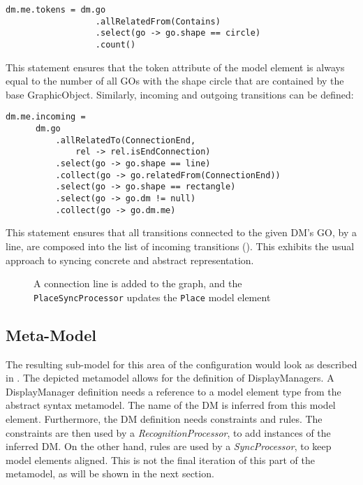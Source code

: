 \begin{lstlisting}[captionpos=b,caption={Rule that syncs the token count of a place element}]
dm.me.tokens = dm.go
                  .allRelatedFrom(Contains)
                  .select(go -> go.shape == circle)
                  .count()
\end{lstlisting}

This statement ensures that the token attribute of the model element is always equal to the number of all GOs with the shape circle that are contained by the base GraphicObject. Similarly, incoming and outgoing transitions can be defined:
\begin{lstlisting}[captionpos=b,caption={Rule that syncs incoming transitions of a place element},label={lst:incoming-transitions}]
dm.me.incoming = 
      dm.go
          .allRelatedTo(ConnectionEnd,
              rel -> rel.isEndConnection)
          .select(go -> go.shape == line)
          .collect(go -> go.relatedFrom(ConnectionEnd))
          .select(go -> go.shape == rectangle)
          .select(go -> go.dm != null)
          .collect(go -> go.dm.me)
\end{lstlisting}

This statement ensures that all transitions connected to the given DM's GO, by a line, are composed into the list of incoming transitions (). This exhibits the usual approach to syncing concrete and abstract representation.


\begin{figure}[h]
  \centering
    
  \caption{A connection line is added to the graph, and the \texttt{PlaceSyncProcessor} updates the \texttt{Place} model element}
  \label{fig:incoming-sync}
\end{figure}

\subsection{Meta-Model}
The resulting sub-model for this area of the configuration would look as described in . The depicted metamodel allows for the definition of DisplayManagers. A DisplayManager definition needs a reference to a model element type from the abstract syntax metamodel. The name of the DM is inferred from this model element. Furthermore, the DM definition needs constraints and rules. The constraints are then used by a \emph{RecognitionProcessor}, to add instances of the inferred DM. On the other hand, rules are used by a \emph{SyncProcessor}, to keep model elements aligned. This is not the final iteration of this part of the metamodel, as will be shown in the next section.

